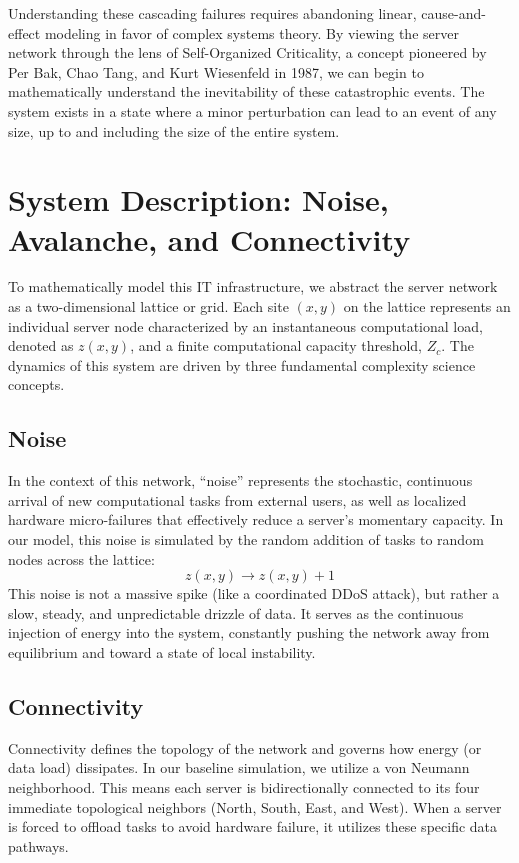 \documentclass[12pt,a4paper]{article}
\begin{document}
Understanding these cascading failures requires abandoning linear, cause-and-effect modeling in favor of complex systems theory. By viewing the server network through the lens of Self-Organized Criticality, a concept pioneered by Per Bak, Chao Tang, and Kurt Wiesenfeld in 1987, we can begin to mathematically understand the inevitability of these catastrophic events. The system exists in a state where a minor perturbation can lead to an event of any size, up to and including the size of the entire system.

\section{System Description: Noise, Avalanche, and Connectivity}
To mathematically model this IT infrastructure, we abstract the server network as a two-dimensional lattice or grid. Each site $(x, y)$ on the lattice represents an individual server node characterized by an instantaneous computational load, denoted as $z(x, y)$, and a finite computational capacity threshold, $Z_c$. The dynamics of this system are driven by three fundamental complexity science concepts.

\subsection{Noise}
In the context of this network, ``noise'' represents the stochastic, continuous arrival of new computational tasks from external users, as well as localized hardware micro-failures that effectively reduce a server's momentary capacity. In our model, this noise is simulated by the random addition of tasks to random nodes across the lattice:
$$z(x, y) \rightarrow z(x, y) + 1$$
This noise is not a massive spike (like a coordinated DDoS attack), but rather a slow, steady, and unpredictable drizzle of data. It serves as the continuous injection of energy into the system, constantly pushing the network away from equilibrium and toward a state of local instability.

\subsection{Connectivity}
Connectivity defines the topology of the network and governs how energy (or data load) dissipates. In our baseline simulation, we utilize a von Neumann neighborhood. This means each server is bidirectionally connected to its four immediate topological neighbors (North, South, East, and West). When a server is forced to offload tasks to avoid hardware failure, it utilizes these specific data pathways. 
\end{document}
